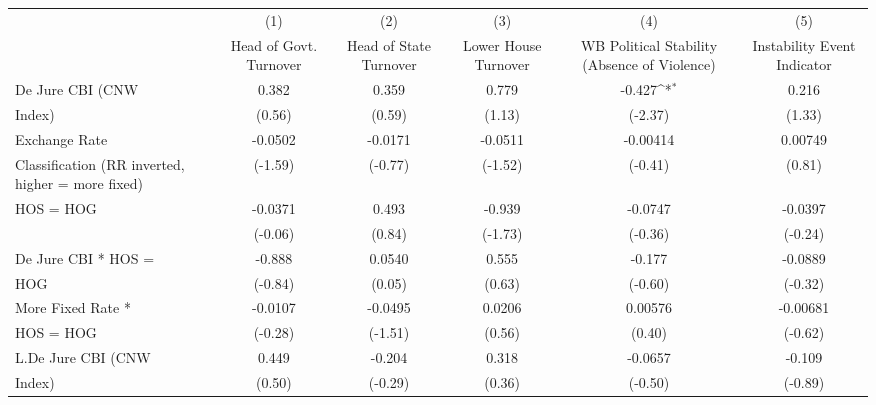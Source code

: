 {
\def\sym#1{\ifmmode^{#1}\else\(^{#1}\)\fi}
\begin{tabular}{l*{5}{c}}
\hline\hline
                    &\multicolumn{1}{c}{(1)}&\multicolumn{1}{c}{(2)}&\multicolumn{1}{c}{(3)}&\multicolumn{1}{c}{(4)}&\multicolumn{1}{c}{(5)}\\
                    &\multicolumn{1}{c}{Head of Govt. Turnover}&\multicolumn{1}{c}{Head of State Turnover}&\multicolumn{1}{c}{Lower House Turnover}&\multicolumn{1}{c}{WB Political Stability (Absence of Violence)}&\multicolumn{1}{c}{Instability Event Indicator}\\
\hline
De Jure CBI (CNW    &       0.382         &       0.359         &       0.779         &      -0.427\sym{*}  &       0.216         \\
Index)              &      (0.56)         &      (0.59)         &      (1.13)         &     (-2.37)         &      (1.33)         \\
[1em]
Exchange Rate       &     -0.0502         &     -0.0171         &     -0.0511         &    -0.00414         &     0.00749         \\
Classification (RR inverted, higher = more fixed)&     (-1.59)         &     (-0.77)         &     (-1.52)         &     (-0.41)         &      (0.81)         \\
[1em]
HOS = HOG           &     -0.0371         &       0.493         &      -0.939         &     -0.0747         &     -0.0397         \\
                    &     (-0.06)         &      (0.84)         &     (-1.73)         &     (-0.36)         &     (-0.24)         \\
[1em]
De Jure CBI * HOS = &      -0.888         &      0.0540         &       0.555         &      -0.177         &     -0.0889         \\
HOG                 &     (-0.84)         &      (0.05)         &      (0.63)         &     (-0.60)         &     (-0.32)         \\
[1em]
More Fixed Rate *   &     -0.0107         &     -0.0495         &      0.0206         &     0.00576         &    -0.00681         \\
HOS = HOG           &     (-0.28)         &     (-1.51)         &      (0.56)         &      (0.40)         &     (-0.62)         \\
[1em]
L.De Jure CBI (CNW  &       0.449         &      -0.204         &       0.318         &     -0.0657         &      -0.109         \\
Index)              &      (0.50)         &     (-0.29)         &      (0.36)         &     (-0.50)         &     (-0.89)         \\

\end{tabular}}
